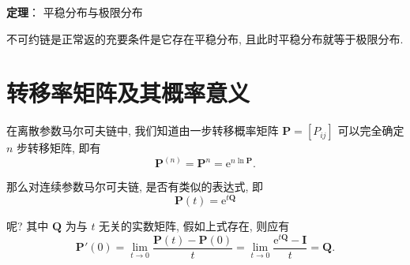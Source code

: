 \documentclass[openany]{ctexbook}
\theoremstyle{kaiti}
\theoremstyle{normal}
\begin{document}
\textbf{定理}： 平稳分布与极限分布

不可约链是正常返的充要条件是它存在平稳分布, 且此时平稳分布就等于极限分布.

\section{转移率矩阵及其概率意义}

在离散参数马尔可夫链中, 我们知道由一步转移概率矩阵 $\bm{P}=[P_{ij}]$ 可以完全确定 $n$ 步转移矩阵, 即有
\begin{equation}
  \bm{P}^{(n)}=\bm{P}^n=\mathrm{e}^{n\ln\bm{P}}.
\end{equation}

那么对连续参数马尔可夫链, 是否有类似的表达式, 即
\begin{equation}
  \bm{P}(t)=\mathrm{e}^{t\bm{Q}}
\end{equation}

呢? 其中 $\bm{Q}$ 为与 $t$ 无关的实数矩阵, 假如上式存在, 则应有
\begin{equation}
  \bm{P}'(0)=\lim_{t\to0}\frac{\bm{P}(t)-\bm{P}(0)}{t}=\lim_{t\to0}\frac{\mathrm{e}^{t\bm{Q}}-\bm{I}}{t}=\bm{Q}.
\end{equation}
\end{document}
